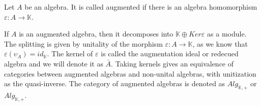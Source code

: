 \documentclass[../thesis.tex]{subfiles}
\begin{document}
            \begin{center}
            \end{center}

            \begin{definition}
                Let $A$ be an algebra. It is called augmented if there is an algebra homomorphism $\varepsilon : A \rightarrow \mathbb{K}$.
            \end{definition}

            If $A$ is an augmented algebra, then it decomposes into $\mathbb{K}\oplus Ker\varepsilon$ as a module. The splitting is given by unitality of the morphism $\varepsilon: A \rightarrow \mathbb{K}$, as we know that $\varepsilon(\upsilon_A) = id_{\mathbb{K}}$. The kernel of $\varepsilon$ is called the augmentation ideal or redecued algebra and we will denote it as $\bar{A}$. Taking kernels gives an equivalence of categories between augmented algebras and non-unital algebras, with unitization as the quasi-inverse. The category of augmented algebras is denoted as $Alg_{\mathbb{K},+}$ or $Alg_{\mathbb{K},+}$.
\end{document}
